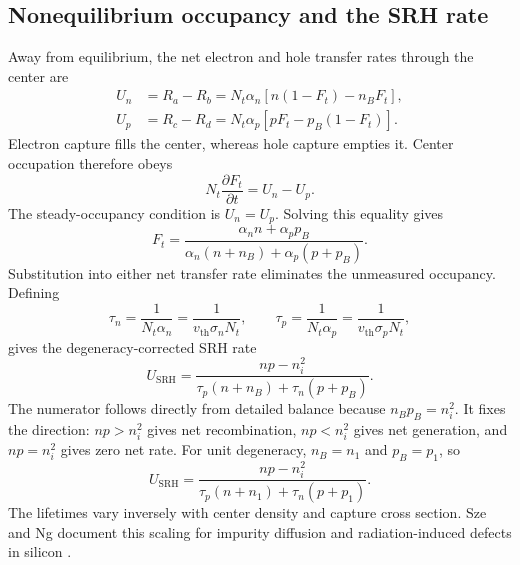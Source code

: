 \subsection{Nonequilibrium occupancy and the SRH rate}

Away from equilibrium, the net electron and hole transfer rates through the
center are
\begin{align}
  U_n&=R_a-R_b
  =N_t\alpha_n\left[n(1-F_t)-n_BF_t\right],\\
  U_p&=R_c-R_d
  =N_t\alpha_p\left[pF_t-p_B(1-F_t)\right].
  \label{eq:srh-electron-hole-net-rates}
\end{align}
Electron capture fills the center, whereas hole capture empties it.  Center
occupation therefore obeys
\begin{equation}
  N_t\frac{\partial F_t}{\partial t}=U_n-U_p.
  \label{eq:srh-center-occupancy-balance}
\end{equation}
The steady-occupancy condition is $U_n=U_p$.  Solving this equality gives
\begin{equation}
  F_t=
  \frac{\alpha_n n+\alpha_p p_B}
  {\alpha_n(n+n_B)+\alpha_p(p+p_B)}.
  \label{eq:srh-nonequilibrium-center-occupation}
\end{equation}
Substitution into either net transfer rate eliminates the unmeasured occupancy.
Defining
\begin{equation}
  \tau_n=\frac{1}{N_t\alpha_n}
  =\frac{1}{v_{\mathrm{th}}\sigma_nN_t},
  \qquad
  \tau_p=\frac{1}{N_t\alpha_p}
  =\frac{1}{v_{\mathrm{th}}\sigma_pN_t},
  \label{eq:srh-capture-lifetimes}
\end{equation}
gives the degeneracy-corrected SRH rate
\begin{equation}
  \boxed{
  U_{\mathrm{SRH}}
  =\frac{np-n_i^2}
  {\tau_p(n+n_B)+\tau_n(p+p_B)}.
  }
  \label{eq:srh-general-rate}
\end{equation}
The numerator follows directly from detailed balance because
$n_Bp_B=n_i^2$.  It fixes the direction: $np>n_i^2$ gives net recombination,
$np<n_i^2$ gives net generation, and $np=n_i^2$ gives zero net rate.
For unit degeneracy, $n_B=n_1$ and $p_B=p_1$, so
\begin{equation}
  U_{\mathrm{SRH}}
  =\frac{np-n_i^2}
  {\tau_p(n+n_1)+\tau_n(p+p_1)}.
  \label{eq:srh-rate}
\end{equation}
The lifetimes vary inversely with center density and capture cross section.
Sze and Ng document this scaling for impurity diffusion and radiation-induced
defects in silicon \cite[Sec.~1.5.4, Eqs.~(95a)--(97)]{szeNg2007}.

